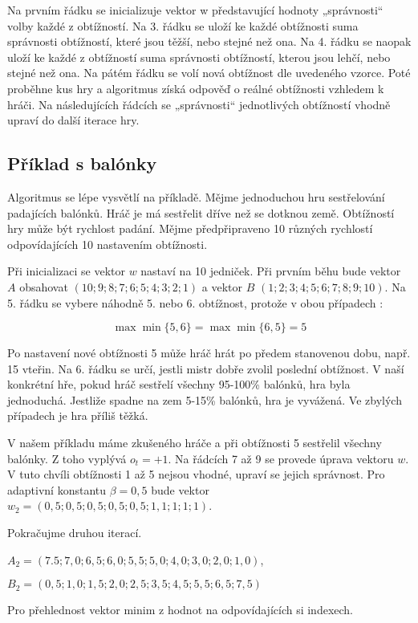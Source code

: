 Na prvním řádku se inicializuje vektor w představující hodnoty „správnosti“ volby každé z obtížností. Na 3. řádku se uloží ke každé obtížnosti suma správnosti obtížností, které jsou těžší, nebo stejné než ona. Na 4. řádku se naopak uloží ke každé z obtížností suma správnosti obtížností, kterou jsou lehčí, nebo stejné než ona. Na pátém řádku se volí nová obtížnost dle uvedeného vzorce. Poté proběhne kus hry a algoritmus získá odpověď o reálné obtížnosti vzhledem k hráči. Na následujících řádcích se „správnosti“ jednotlivých obtížností vhodně upraví do další iterace hry.

\subsection{Příklad s balónky}

Algoritmus se lépe vysvětlí na příkladě.\cite{23posm2} Mějme jednoduchou hru sestřelování padajících balónků. Hráč je má sestřelit dříve než se dotknou země. Obtížností hry může být rychlost padání. Mějme předpřipraveno 10 různých rychlostí odpovídajících 10 nastavením obtížnosti.

Při inicializaci se vektor $w$ nastaví na 10 jedniček. Při prvním běhu bude vektor $A$ obsahovat $(10; 9; 8; 7; 6; 5; 4; 3; 2; 1)$ a vektor $B$ $(1; 2; 3; 4; 5; 6; 7; 8; 9; 10)$. Na 5. řádku se vybere náhodně 5. nebo 6. obtížnost, protože v obou případech :


	\[
	\max{\min{\{5, 6\}}} = \max{\min{\{6, 5\}}} = 5
\]

Po nastavení nové obtížnosti 5 může hráč hrát po předem stanovenou dobu, např. 15 vteřin. Na 6. řádku se určí, jestli mistr dobře zvolil poslední obtížnost. V naší konkrétní hře, pokud hráč sestřelí všechny 95-100\% balónků, hra byla jednoduchá. Jestliže spadne na zem 5-15\% balónků, hra je vyvážená. Ve zbylých případech je hra příliš těžká.

V našem příkladu máme zkušeného hráče a při obtížnosti 5 sestřelil všechny balónky. Z toho vyplývá $o_t=+1$. Na řádcích 7 až 9 se provede úprava vektoru $w$. V tuto chvíli obtížnosti 1 až 5 nejsou vhodné, upraví se jejich správnost. Pro adaptivní konstantu $\beta=0,5$ bude vektor $w_2=(0,5;0,5;0,5;0,5;0,5;1,1;1;1;1)$.

Pokračujme druhou iterací. 

$A_2=(7.5;7,0;6,5;6,0;5,5;5,0;4,0;3,0;2,0;1,0)$, 

$B_2=(0,5;1,0;1,5;2,0;2,5;3,5;4,5;5,5;6,5;7,5)$

Pro přehlednost vektor minim z hodnot na odpovídajících si indexech.

